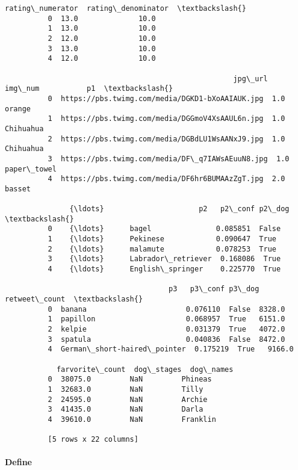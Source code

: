 \documentclass[11pt]{article}
\begin{document}
\begin{Verbatim}[commandchars=\\\{\}]
             rating\_numerator  rating\_denominator  \textbackslash{}
          0  13.0              10.0                 
          1  13.0              10.0                 
          2  12.0              10.0                 
          3  13.0              10.0                 
          4  12.0              10.0                 
          
                                                     jpg\_url  img\_num           p1  \textbackslash{}
          0  https://pbs.twimg.com/media/DGKD1-bXoAAIAUK.jpg  1.0      orange        
          1  https://pbs.twimg.com/media/DGGmoV4XsAAUL6n.jpg  1.0      Chihuahua     
          2  https://pbs.twimg.com/media/DGBdLU1WsAANxJ9.jpg  1.0      Chihuahua     
          3  https://pbs.twimg.com/media/DF\_q7IAWsAEuuN8.jpg  1.0      paper\_towel   
          4  https://pbs.twimg.com/media/DF6hr6BUMAAzZgT.jpg  2.0      basset        
          
               {\ldots}                      p2   p2\_conf p2\_dog  \textbackslash{}
          0    {\ldots}      bagel               0.085851  False   
          1    {\ldots}      Pekinese            0.090647  True    
          2    {\ldots}      malamute            0.078253  True    
          3    {\ldots}      Labrador\_retriever  0.168086  True    
          4    {\ldots}      English\_springer    0.225770  True    
          
                                      p3   p3\_conf p3\_dog  retweet\_count  \textbackslash{}
          0  banana                       0.076110  False  8328.0          
          1  papillon                     0.068957  True   6151.0          
          2  kelpie                       0.031379  True   4072.0          
          3  spatula                      0.040836  False  8472.0          
          4  German\_short-haired\_pointer  0.175219  True   9166.0          
          
            farvorite\_count  dog\_stages  dog\_names  
          0  38075.0         NaN         Phineas    
          1  32683.0         NaN         Tilly      
          2  24595.0         NaN         Archie     
          3  41435.0         NaN         Darla      
          4  39610.0         NaN         Franklin   
          
          [5 rows x 22 columns]
\end{Verbatim}
            
    \hypertarget{define}{%
\paragraph{Define}\label{define}}
\end{document}

